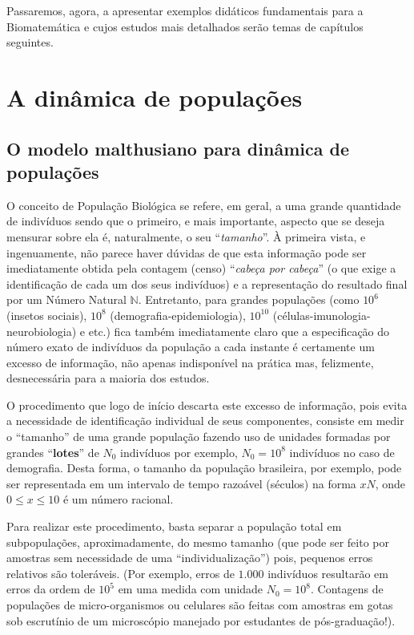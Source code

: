     Passaremos, agora, a apresentar exemplos didáticos fundamentais para a Biomatemática e cujos estudos mais detalhados serão temas de capítulos seguintes.



\section{A dinâmica de populações}

\subsection{O modelo malthusiano para dinâmica de populações}

    O conceito de População Biológica se refere, em geral, a uma grande quantidade de indivíduos sendo que o primeiro, e mais importante, aspecto que se deseja mensurar sobre ela é, naturalmente, o seu ``\textit{tamanho}''. À primeira vista, e ingenuamente, não parece haver dúvidas de que esta informação pode ser imediatamente obtida pela contagem (censo) ``\textit{cabeça por cabeça}'' (o que exige a identificação de cada um dos seus indivíduos) e a representação do resultado final por um Número Natural \(\mathbb{N}\). Entretanto, para grandes populações (como \(10^6\) (insetos sociais), \(10^8\) (demografia-epidemiologia), \(10^{10}\) (células-imunologia-neurobiologia) e etc.) fica também imediatamente claro que a especificação do número exato de indivíduos da população a cada instante é certamente um excesso de informação, não apenas indisponível na prática mas, felizmente, desnecessária para a maioria dos estudos.

    O procedimento que logo de início descarta este excesso de informação, pois evita a necessidade de identificação individual de seus componentes, consiste em medir o ``tamanho'' de uma grande população fazendo uso de unidades formadas por grandes ``\textbf{lotes}'' de \(N_{0}\) indivíduos por exemplo, \(N_{0} = 10^8\) indivíduos no caso de demografia. Desta forma, o tamanho da população brasileira, por exemplo, pode ser representada em um intervalo de tempo razoável (séculos) na forma \(xN\), onde \(0 \le x \le 10\) é um número racional.

    Para realizar este procedimento, basta separar a população total em subpopulações, aproximadamente, do mesmo tamanho (que pode ser feito por amostras sem necessidade de uma ``individualização'') pois, pequenos erros relativos são toleráveis. (Por exemplo, erros de \(1.000\) indivíduos resultarão em erros da ordem de \(10^{5}\) em uma medida com unidade \(N_{0} = 10^{8}\). Contagens de populações de micro-organismos ou celulares são feitas com amostras em gotas sob escrutínio de um microscópio manejado por estudantes de pós-graduação!).

